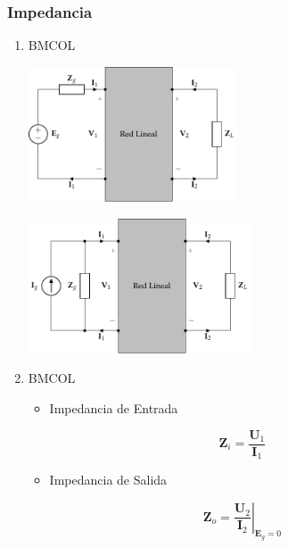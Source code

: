 \subsubsection{Impedancia}
\label{sec:org591ea39}
\begin{enumerate}
\item \hfill{}\textsc{BMCOL}
\label{sec:orgd9d6752}

\includegraphics[height=4cm]{../figs/cuadripolo_cargado_fuente_tension.pdf}


\includegraphics[height=4cm]{../figs/cuadripolo_cargado_fuente_corriente.pdf}



\item \hfill{}\textsc{BMCOL}
\label{sec:orgc27df88}
\begin{itemize}
\item Impedancia de Entrada
\end{itemize}
\[
\mathbf{Z}_i = \frac{\mathbf{U}_1}{\mathbf{I}_1}
\]

\begin{itemize}
\item Impedancia de Salida
\end{itemize}
\[
\mathbf{Z}_o = \left.\frac{\mathbf{U}_2}{\mathbf{I}_2}\right\rvert_{\mathbf{E}_g = 0}
\]
\end{enumerate}

